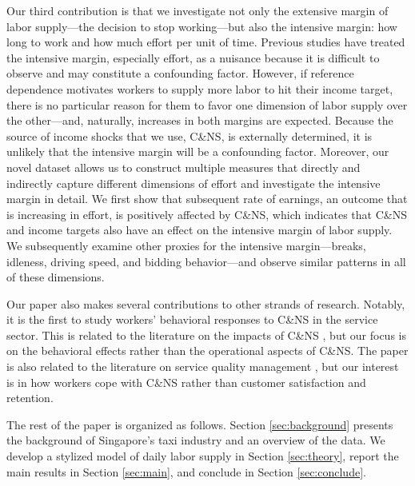 \documentclass[reviewmode,AEJ]{AEA}
\begin{document}
Our third contribution is that we investigate not only the extensive margin of labor supply---the decision
to stop working---but also the intensive margin: how long to work and how much effort per unit of time. 
Previous studies have treated the intensive margin, especially effort, as a nuisance because it is 
difficult to observe and may constitute a confounding factor. However, if reference dependence motivates
workers to supply more labor to hit their income target, there is no particular reason for them to favor
one dimension of labor supply over the other---and, naturally, increases in both margins are expected.
Because the source of income shocks that we use, C\&NS, is externally determined, it is unlikely that the 
intensive margin will be a confounding factor. Moreover, our novel dataset allows us to construct multiple
measures that directly and indirectly capture different dimensions of effort and investigate the intensive
margin in detail. We first show that subsequent rate of earnings, an outcome that is increasing in effort,
is positively affected by C\&NS, which indicates that C\&NS and income targets also have an effect on the
intensive margin of labor supply. We subsequently examine other proxies for the intensive margin---breaks,
idleness, driving speed, and bidding behavior---and observe similar patterns in all of these dimensions.

Our paper also makes several contributions to other strands of research. Notably, it is the first to study
workers' behavioral responses to C\&NS in the service sector. This is related to the literature on the
impacts of C\&NS \citep{moore2001time,patrick2008reducing,norris2014empirical,feldman2014appointment}, 
but our focus is on the behavioral effects rather than the operational aspects of C\&NS. 
The paper is also related to the literature on service quality management \citep{cohen2018frustration},
but our interest is in how workers cope with C\&NS rather than customer satisfaction and retention. 

The rest of the paper is organized as follows. 
Section \ref{sec:background} presents the background of Singapore's taxi industry and an overview of the data. 
We develop a stylized model of daily labor supply in Section \ref{sec:theory}, 
report the main results in Section \ref{sec:main}, and conclude in Section \ref{sec:conclude}.

\end{document}

